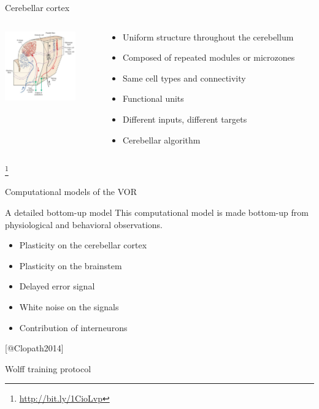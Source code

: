\begin{frame}{Cerebellar cortex}
	\begin{columns}[T]
		\begin{column}[T]{5cm}
			\includegraphics[height=3cm]{images/tmp15F112.jpg}
		\end{column}
		\begin{column}[T]{5cm}
			\begin{itemize}
				\item Uniform structure throughout the cerebellum
				\item Composed of repeated modules or microzones
				\item Same cell types and connectivity
				\item Functional units
				\item Different inputs, different targets
				\item Cerebellar algorithm
			\end{itemize}
		\end{column}
	\end{columns}
	\footnote{\url{http://bit.ly/1CioLvp}}
\end{frame}


\begin{frame}{Computational models of the VOR}
\end{frame}


\begin{frame}{A detailed bottom-up model}
	This computational model is made bottom-up from physiological and behavioral observations.
	\begin{itemize}
		\item Plasticity on the cerebellar cortex
		\item Plasticity on the brainstem
		\item Delayed error signal
		\item White noise on the signals
		\item Contribution of interneurons
	\end{itemize}
	[@Clopath2014]
\end{frame}


\begin{frame}{Wolff training protocol}
\end{frame}
